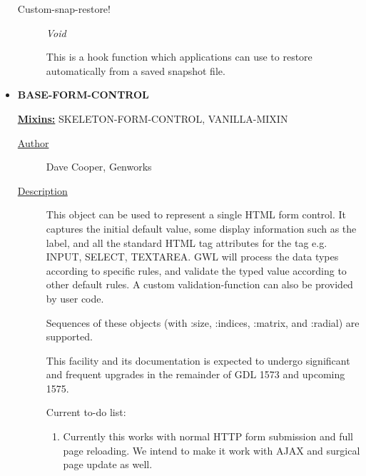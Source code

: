 \documentclass [11pt]{book}
\begin{document}
\begin{itemize}
\begin{description}

\item [Custom-snap-restore!]
\emph{Void}

 This is a hook function which applications can use to restore automatically
from a saved snapshot file.




\end{description}







\item {}
\label{prim:base-form-control}
\textbf{BASE-FORM-CONTROL}


\textbf{
\underline{Mixins:}} SKELETON-FORM-CONTROL, VANILLA-MIXIN





\begin{description}

\item [
\underline{Author}]


Dave Cooper, Genworks



\item [
\underline{Description}]


This object can be used to represent a single HTML form control. It captures the 
initial default value, some display information such as the label, and all the standard HTML tag attributes
for the tag e.g. INPUT, SELECT, TEXTAREA. GWL will process the data types according to specific rules,
and validate the typed value according to other default rules. A custom validation-function can also 
be provided by user code. 

Sequences of these objects (with :size, :indices, :matrix, and :radial) are supported.

This facility and its documentation is expected to undergo significant and frequent upgrades in the remainder of GDL 1573 and upcoming 1575.

Current to-do list:



\begin{enumerate}

\item 
Currently this works with normal HTTP form submission and full page reloading. 
We intend to make it work with AJAX and surgical page update as well.




\end{enumerate}
\end{description}
\end{itemize}
\end{document}
